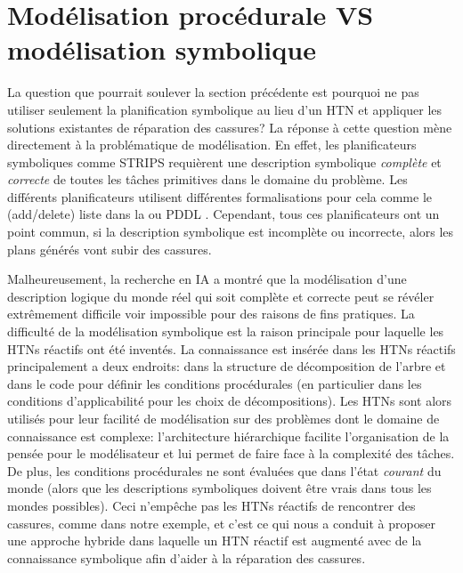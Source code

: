 \documentclass[a4paper,twoside,french]{article}
\begin{document}
		\section {Modélisation procédurale VS modélisation symbolique}
		La question que pourrait soulever la section précédente est pourquoi ne pas utiliser seulement la planification symbolique au lieu d'un HTN et appliquer les solutions existantes de réparation des cassures? La réponse à cette question mène directement à la problématique de modélisation. En effet, les planificateurs symboliques comme STRIPS requièrent une description symbolique {\em complète} et {\em correcte} de toutes les tâches primitives dans le domaine du problème. Les différents planificateurs utilisent différentes formalisations pour cela comme le (add/delete) liste dans la  ou PDDL \cite{ghallab1998pddl}. Cependant, tous ces planificateurs ont un point  commun, si la description symbolique est incomplète ou incorrecte, alors les plans générés vont subir des cassures. 
		\par Malheureusement, la recherche en IA \cite{le-même} a montré que la modélisation d'une description logique du monde réel qui soit complète et correcte  peut se révéler extrêmement difficile voir impossible  pour des raisons de fins pratiques.  La difficulté de la modélisation symbolique est la raison principale pour laquelle les HTNs réactifs ont été inventés. La connaissance est insérée dans les HTNs réactifs principalement a deux endroits: dans la structure de décomposition de l'arbre et dans le code pour définir les conditions procédurales (en particulier dans les conditions d'applicabilité pour les choix de décompositions). Les HTNs sont alors utilisés pour leur facilité de modélisation sur des problèmes dont le domaine de connaissance est complexe: l'architecture hiérarchique facilite l'organisation de la pensée pour le modélisateur et lui permet de faire face à la complexité des tâches. De plus, les conditions procédurales ne sont évaluées que dans l'état {\em courant} du monde (alors que les descriptions symboliques doivent être vrais dans tous les mondes possibles). Ceci n'empêche pas les HTNs réactifs de rencontrer des cassures, comme dans notre exemple, et c'est ce qui nous a conduit à proposer une approche hybride dans laquelle un HTN réactif est augmenté avec de la connaissance symbolique afin d'aider à la réparation des cassures.
		
\end{document}

